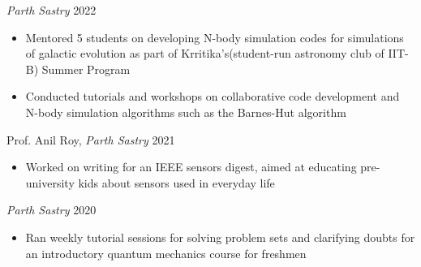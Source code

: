 {
    \emph{Parth Sastry}
}
{
    2022
}
{
    \begin{itemize}
        \item Mentored 5 students on developing N-body simulation codes for simulations of galactic evolution as part of Krritika's(student-run astronomy club of IIT-B) Summer Program
        \item Conducted tutorials and workshops on collaborative code development and N-body simulation algorithms such as the Barnes-Hut algorithm
    \end{itemize}
}

{
    Prof. Anil Roy, \emph{Parth Sastry}
}
{
    2021
}
{
    \begin{itemize}
        \item Worked on writing for an IEEE sensors digest, aimed at educating pre-university kids about
        sensors used in everyday life
    \end{itemize}
}

{
    \emph{Parth Sastry}
}
{
    2020
}
{
    \begin{itemize}
        \item Ran weekly tutorial sessions for solving problem sets and clarifying doubts for an introductory quantum mechanics course for freshmen
    \end{itemize}
}